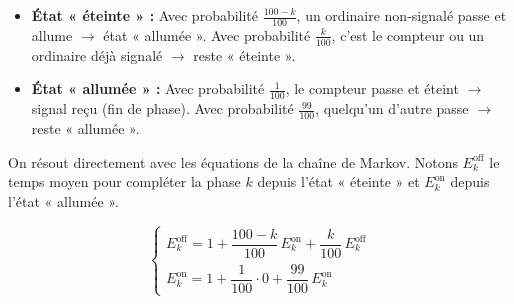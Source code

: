 \begin{center}
\end{center}

\begin{itemize}
    \item \textbf{État « éteinte » :} Avec probabilité $\frac{100-k}{100}$, un ordinaire non-signalé passe et allume $\to$ état « allumée ». Avec probabilité $\frac{k}{100}$, c'est le compteur ou un ordinaire déjà signalé $\to$ reste « éteinte ».
    \item \textbf{État « allumée » :} Avec probabilité $\frac{1}{100}$, le compteur passe et éteint $\to$ signal reçu (fin de phase). Avec probabilité $\frac{99}{100}$, quelqu'un d'autre passe $\to$ reste « allumée ».
\end{itemize}

On résout directement avec les équations de la chaîne de Markov. Notons $E_k^{\text{off}}$ le temps moyen pour compléter la phase $k$ depuis l'état « éteinte » et $E_k^{\text{on}}$ depuis l'état « allumée ».

\[
\begin{cases}
E_k^{\text{off}} = 1 + \dfrac{100-k}{100}\,E_k^{\text{on}} + \dfrac{k}{100}\,E_k^{\text{off}} \\[12pt]
E_k^{\text{on}} = 1 + \dfrac{1}{100}\cdot 0 + \dfrac{99}{100}\,E_k^{\text{on}}
\end{cases}
\]


